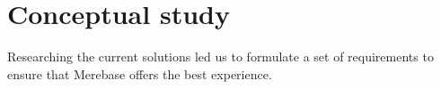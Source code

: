 \chapter{Conceptual study}
\label{chap:conceptual}

\noindent Researching the current solutions led us to formulate a set of
requirements to ensure that Merebase offers the best experience.